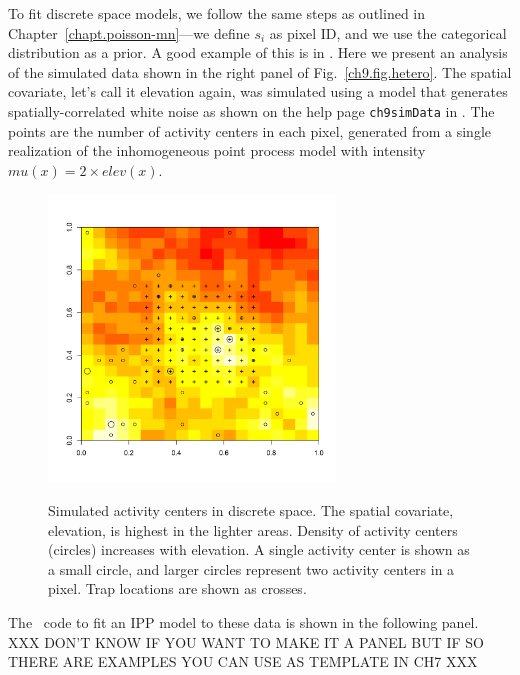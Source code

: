 To fit discrete space models, we follow the same steps
as outlined in Chapter~\ref{chapt.poisson-mn}---we define $s_i$ as
pixel ID, and we use the categorical distribution as a prior. A good
example of this is in \citep{mollet_etal:2012}. Here we present
an analysis of the simulated data shown in the right panel of
Fig.~\ref{ch9.fig.hetero}. The spatial covariate, let's call it
elevation again, was simulated
using a model that generates spatially-correlated
white noise as shown on the help page
\verb+ch9simData+ in \scrbook. The points are the number of
activity centers in each pixel, generated from a single realization of
the inhomogeneous point process model with intensity
$mu(x) = 2 \times elev(x)$.


\begin{figure}
\centering
\includegraphics[width=3in,height=3in]{Ch11/figs/discrete}
\label{ch9.fig.discrete}
\caption{Simulated activity centers in discrete space. The spatial
  covariate, elevation, is highest in the lighter areas. Density of
  activity centers (circles) increases with elevation. A single
  activity center is shown as a small circle, and larger circles
  represent two activity centers in a pixel. Trap locations
  are shown as crosses.}
\end{figure}


The \bugs~code to fit an IPP model to these data is shown in
the following panel. XXX DON'T KNOW IF YOU WANT TO MAKE IT A PANEL BUT IF SO THERE ARE EXAMPLES YOU CAN USE AS TEMPLATE IN CH7 XXX

